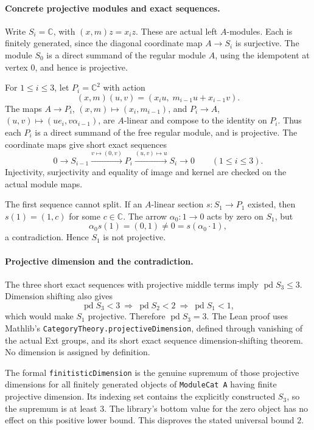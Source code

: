 \documentclass[11pt,a4paper]{article}
\newcommand{\C}{\mathbb C}
\newcommand{\pd}{\operatorname{pd}}
\begin{document}
\paragraph{Concrete projective modules and exact sequences.}
Write $S_i=\C$, with $(x,m)z=x_i z$. These are actual left $A$-modules. Each is
finitely generated, since the diagonal coordinate map $A\to S_i$ is
surjective. The module $S_0$ is a direct summand of the regular module $A$,
using the idempotent at vertex $0$, and hence is projective.

For $1\leq i\leq3$, let $P_i=\C^2$ with action
\[
(x,m)(u,v)=(x_i u,\;m_{i-1}u+x_{i-1}v).
\]
The maps $A\to P_i$, $(x,m)\mapsto(x_i,m_{i-1})$, and
$P_i\to A$, $(u,v)\mapsto(u e_i,v\alpha_{i-1})$, are $A$-linear and compose
to the identity on $P_i$. Thus each $P_i$ is a direct summand of the free
regular module, and is projective. The coordinate maps give short exact
sequences
\[
0\longrightarrow S_{i-1}\xrightarrow{v\mapsto(0,v)}
P_i\xrightarrow{(u,v)\mapsto u}S_i\longrightarrow0
\qquad(1\leq i\leq3).
\]
Injectivity, surjectivity and equality of image and kernel are checked on the
actual module maps.

The first sequence cannot split. If an $A$-linear section $s:S_1\to P_1$
existed, then $s(1)=(1,c)$ for some $c\in\C$. The arrow $\alpha_0:1\to0$
acts by zero on $S_1$, but
\[
\alpha_0s(1)=(0,1)\ne0=s(\alpha_0\cdot1),
\]
a contradiction. Hence $S_1$ is not projective.

\paragraph{Projective dimension and the contradiction.}
The three short exact sequences with projective middle terms imply
$\pd S_3\leq3$. Dimension shifting also gives
\[
\pd S_3<3\ \Longrightarrow\ \pd S_2<2
\ \Longrightarrow\ \pd S_1<1,
\]
which would make $S_1$ projective. Therefore $\pd S_3=3$.
The Lean proof uses Mathlib's \texttt{CategoryTheory.projectiveDimension},
defined through vanishing of the actual Ext groups, and its short exact
sequence dimension-shifting theorem. No dimension is assigned by definition.

The formal \texttt{finitisticDimension} is the genuine supremum of those
projective dimensions for all finitely generated objects of
\texttt{ModuleCat A} having finite projective dimension. Its indexing set
contains the explicitly constructed $S_3$, so the supremum is at least $3$.
The library's bottom value for the zero object has no effect on this positive
lower bound. This disproves the stated universal bound $2$.
\end{document}
